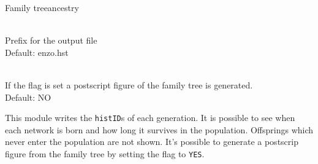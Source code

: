 \begin{moduledoc}{Family tree}{ancestry}
  \item[\KeyWord{historyFile} \optParam{ histfile } ]~\\
    Prefix for the output file\\
    Default: enzo.hst
  \item[\KeyWord{ancestryPS} \optParam{ x } ]~\\
    If the flag is set a postscript figure of the family tree is generated.\\
    Default: NO
\end{moduledoc}
 This module writes the \verb+histID+s of each generation.
It is possible to see when each network is born and how long
it survives in the population. Offsprings which
never enter the population are not shown.
It's possible to generate a postscrip figure from the family tree
by setting the flag to \verb+YES+.

